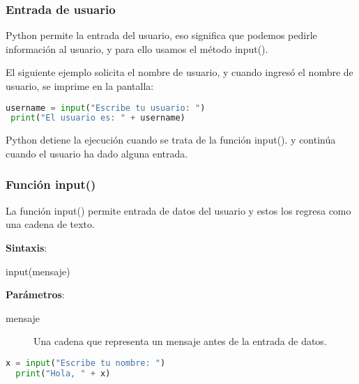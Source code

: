 \begin{frame}[fragile]
  \frametitle{Entrada de usuario}

  Python permite la entrada del usuario, eso significa que podemos pedirle
  información al usuario, y para ello usamos el método
  \textcolor{codeKeyword2}{input}().

  \vspace{\baselineskip}
  El siguiente ejemplo solicita el nombre de usuario, y cuando ingresó el
  nombre de usuario, se imprime en la pantalla:

  \vspace{\baselineskip}
  \begin{lstlisting}[language=Python]
 username = input("Escribe tu usuario: ")
 print("El usuario es: " + username)
  \end{lstlisting}

  \pausa
  \begin{exampleblock}{}
    Python detiene la ejecución cuando se trata de la función
    \textcolor{codeKeyword2}{input}().
    y continúa cuando el usuario ha dado alguna entrada.
  \end{exampleblock}
\end{frame}

\begin{frame}[fragile]
  \frametitle{Función input()}

  La función \textcolor{codeKeyword2}{input}() permite entrada de datos del
  usuario y estos los regresa como una cadena de texto.

  \vspace{\baselineskip}
  \textbf{Sintaxis}:

  \vspace{\baselineskip}
  \textcolor{codeKeyword2}{input}(mensaje)

  \vspace{\baselineskip}
  \textbf{Parámetros}:
  \begin{description}
    \item[mensaje] Una cadena que representa un mensaje antes de la entrada
      de datos.
  \end{description}

  \vspace{\baselineskip}
  \begin{lstlisting}[language=Python]
  x = input("Escribe tu nombre: ")
  print("Hola, " + x)
  \end{lstlisting}
\end{frame}

